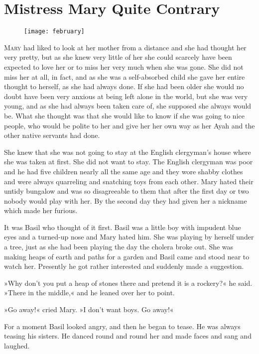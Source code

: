\chapter{Mistress Mary Quite Contrary} 
	
\begin{figure}[t!]
\centering
\texttt{[image: february]}
\end{figure}

 \lettrine[lines=6]{M}{ary} had liked to look at her mother from a distance and she had thought her very pretty, but as she knew very little of her she could scarcely have been expected to love her or to miss her very much when she was gone. She did not miss her at all, in fact, and as she was a self-absorbed child she gave her entire thought to herself, as she had always done. If she had been older she would no doubt have been very anxious at being left alone in the world, but she was very young, and as she had always been taken care of, she supposed she always would be. What she thought was that she would like to know if she was going to nice people, who would be polite to her and give her her own way as her Ayah and the other native servants had done.

She knew that she was not going to stay at the English clergyman's house where she was taken at first. She did not want to stay. The English clergyman was poor and he had five children nearly all the same age and they wore shabby clothes and were always quarreling and snatching toys from each other. Mary hated their untidy bungalow and was so disagreeable to them that after the first day or two nobody would play with her. By the second day they had given her a nickname which made her furious.

It was Basil who thought of it first. Basil was a little boy with impudent blue eyes and a turned-up nose and Mary hated him. She was playing by herself under a tree, just as she had been playing the day the cholera broke out. She was making heaps of earth and paths for a garden and Basil came and stood near to watch her. Presently he got rather interested and suddenly made a suggestion.

»Why don't you put a heap of stones there and pretend it is a rockery?« he said. »There in the middle,« and he leaned over her to point.

»Go away!« cried Mary. »I don't want boys. Go away!«

For a moment Basil looked angry, and then he began to tease. He was always teasing his sisters. He danced round and round her and made faces and sang and laughed.

